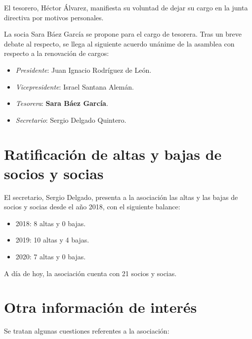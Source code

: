\documentclass[a4paper, 12pt]{article}
\begin{document}
El tesorero, Héctor Álvarez, manifiesta su voluntad de dejar su cargo en la junta directiva por motivos personales.

La socia Sara Báez García se propone para el cargo de tesorera. Tras un breve debate al respecto, se llega al siguiente acuerdo unánime de la asamblea con respecto a la renovación de cargos:

\begin{itemize}
    \item \textit{Presidente}: Juan Ignacio Rodríguez de León.
    \item \textit{Vicepresidente}: Israel Santana Alemán.
    \item \textit{Tesorera}: \textbf{Sara Báez García}.
    \item \textit{Secretario}: Sergio Delgado Quintero.
\end{itemize}

\section{Ratificación de altas y bajas de socios y socias}

El secretario, Sergio Delgado, presenta a la asociación las altas y las bajas de socios y socias desde el año 2018, con el siguiente balance:

\begin{itemize}
    \item 2018: 8 altas y 0 bajas.
    \item 2019: 10 altas y 4 bajas.
    \item 2020: 7 altas y 0 bajas.
\end{itemize}

A día de hoy, la asociación cuenta con 21 socios y socias.

\section{Otra información de interés}

Se tratan algunas cuestiones referentes a la asociación:
\end{document}
